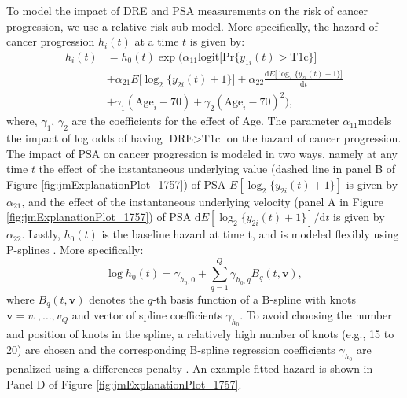 To model the impact of DRE and PSA measurements on the risk of cancer progression, we use a relative risk sub-model. More specifically, the hazard of cancer progression $h_i(t)$ at a time $t$ is given by:
\begin{equation}
\label{eq:rel_risk_model}
\begin{aligned}
    h_i(t) &= h_0(t) \exp\Big(\alpha_{11} \mbox{logit} \big[\mbox{Pr}\{y_{1i}(t) > \mbox{T1c}\}\big]\\
    &+ \alpha_{21} E\big[\log_2 \big\{y_{2i}(t) + 1\big\}\big] + \alpha_{22} \frac{\mathrm{d}{E\big[\log_2 \big\{y_{2i}(t) + 1\big\}\big]}}{\mathrm{d}{t}}\\
    &+ \gamma_1 (\mbox{Age}_i-70) + \gamma_2 (\mbox{Age}_i-70)^2 \Big),
    \end{aligned}
\end{equation}
where, $\gamma_1$, $\gamma_2$ are the coefficients for the effect of Age. The parameter $\alpha_{11}$models the impact of log odds of having $\mbox{DRE} > \mbox{T1c}$ on the hazard of cancer progression. The impact of PSA on cancer progression is modeled in two ways, namely at any time $t$ the effect of the instantaneous underlying value (dashed line in panel B of Figure  \ref{fig:jmExplanationPlot_1757}) of PSA $E[\log_2 \{y_{2i}(t) + 1\}]$ is given by $\alpha_{21}$, and the effect of the instantaneous underlying velocity (panel A in Figure \ref{fig:jmExplanationPlot_1757}) of PSA $\mathrm{d}{E[\log_2 \{y_{2i}(t) + 1\}]}/\mathrm{d}{t}$ is given by $\alpha_{22}$. Lastly, $h_0(t)$ is the baseline hazard at time t, and is modeled flexibly using P-splines \citep{eilers1996flexible}. More specifically:
\begin{equation*}
\log{h_0(t)} = \gamma_{h_0,0} + \sum_{q=1}^Q \gamma_{h_0,q} B_q(t, \boldsymbol{v}),
\end{equation*}
where $B_q(t, \boldsymbol{v})$ denotes the $q$-th basis function of a B-spline with knots $\boldsymbol{v} = v_1, \ldots, v_Q$ and vector of spline coefficients $\gamma_{h_0}$. To avoid choosing the number and position of knots in the spline, a relatively high number of knots (e.g., 15 to 20) are chosen and the corresponding B-spline regression coefficients $\gamma_{h_0}$ are penalized using a differences penalty \citep{eilers1996flexible}. An example fitted hazard is shown in Panel D of Figure \ref{fig:jmExplanationPlot_1757}.  

